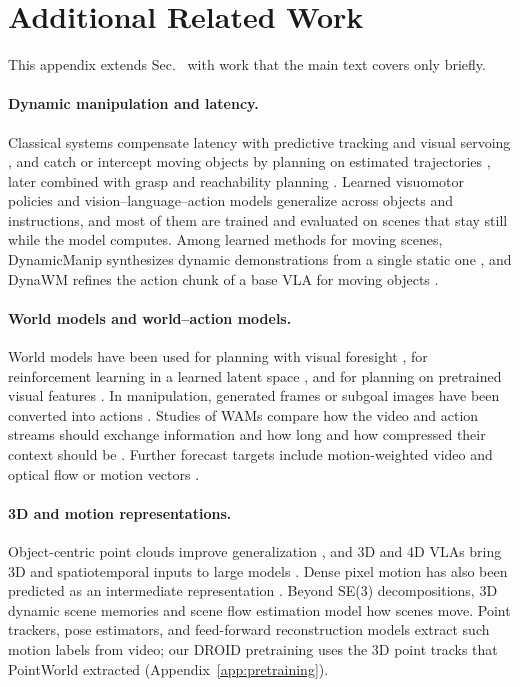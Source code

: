 \section{Additional Related Work}
\label{app:related}
This appendix extends Sec.~ with work that the main text
covers only briefly.

\paragraph{Dynamic manipulation and latency.}
Classical systems compensate latency with predictive tracking \cite{azuma1994} and
visual servoing \cite{hutchinson1996}, and catch or intercept moving objects by
planning on estimated trajectories \cite{hove1991,allen1993,baeuml2010}, later
combined with grasp and reachability planning
\cite{marturi2019dynamic,akinola2021dynamic}. Learned visuomotor policies
\cite{act,diffusionpolicy} and vision--language--action models
\cite{rt1,rt2,octo,openvla,pi0,pi05} generalize across objects and instructions,
and most of them are trained and evaluated on scenes that stay still while the
model computes. Among learned methods for moving scenes, DynamicManip synthesizes
dynamic demonstrations from a single static one \cite{dynamicmanip}, and DynaWM
refines the action chunk of a base VLA for moving objects \cite{dynawm}.

\paragraph{World models and world--action models.}
World models have been used for planning with visual foresight
\cite{finn2017deep}, for reinforcement learning in a learned latent space
\cite{dreamerv3,tdmpc2}, and for planning on pretrained visual features
\cite{dinowm,vjepa2}. In manipulation, generated frames or subgoal images have been
converted into actions \cite{unipi,susie,cotvla}. Studies of WAMs compare how the
video and action streams should exchange information
\cite{openwam_alpha,openwam} and how long and how compressed their context should
be \cite{longwam,pactwam}. Further forecast targets include motion-weighted video
\cite{dcwam} and optical flow or motion vectors \cite{flowwam,hifvla}.

\paragraph{3D and motion representations.}
Object-centric point clouds improve generalization \cite{groot}, and 3D and 4D VLAs
bring 3D and spatiotemporal inputs to large models \cite{3dvla,4dvla}. Dense pixel
motion has also been predicted as an intermediate representation
\cite{langtomo,dawn,fofpred}. Beyond SE(3) decompositions, 3D dynamic scene
memories \cite{dsr} and scene flow estimation \cite{flownet3d,raft3d} model how
scenes move. Point trackers, pose estimators, and feed-forward reconstruction models
\cite{cotracker,spatialtracker,foundationpose,vggt,d4rt} extract such motion
labels from video; our DROID pretraining uses the 3D point tracks that PointWorld
extracted \cite{pointworld} (Appendix~\ref{app:pretraining}).
